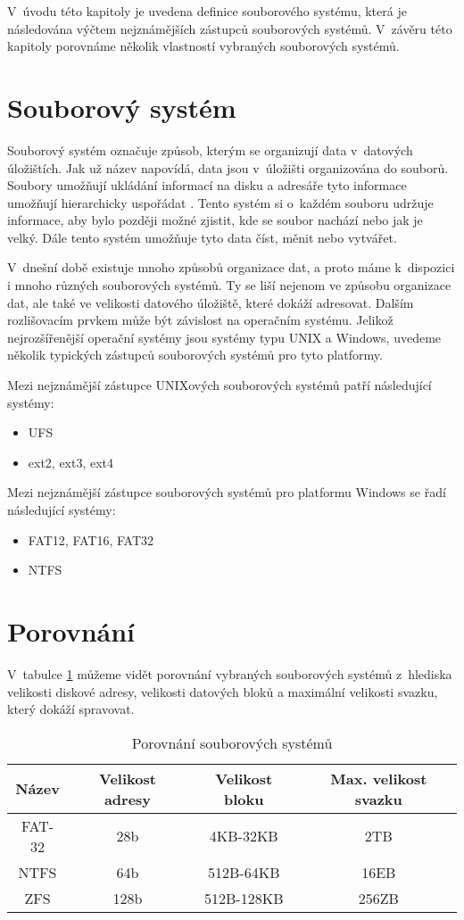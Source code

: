 V~úvodu této kapitoly je uvedena definice souborového systému, která je následována výčtem nejznámějších zástupců souborových systémů. V~závěru této kapitoly porovnáme několik vlastností vybraných souborových systémů.
\section{Souborový systém}
    \label{fs}
    Souborový systém označuje způsob, kterým se organizují data v~datových úložištích. Jak už název napovídá, data jsou v~úložišti organizována do souborů. Soubory umožňují ukládání informací na disku a adresáře tyto informace umožňují hierarchicky uspořádat \cite{fs}. Tento systém si o~každém souboru udržuje informace, aby bylo později možné zjistit, kde se soubor nachází nebo jak je velký. Dále tento systém umožňuje tyto data číst, měnit nebo vytvářet.

    V~dnešní době existuje mnoho způsobů organizace dat, a proto máme k~dispozici i mnoho různých souborových systémů. Ty se liší nejenom ve způsobu organizace dat,
    ale také ve velikosti datového úložiště, které dokáží adresovat. Dalším rozlišovacím prvkem může být závislost na operačním systému.
    Jelikož nejrozšířenější operační systémy jsou systémy typu UNIX a Windows, uvedeme několik typických zástupců souborových systémů pro tyto platformy.

    Mezi nejznámější zástupce UNIXových souborových systémů patří následující systémy:
    \begin{itemize}
      \item UFS
      \item ext2, ext3, ext4
    \end{itemize}

    Mezi nejznámější zástupce souborových systémů pro platformu Windows se řadí následující systémy:
    \begin{itemize}
      \item FAT12, FAT16, FAT32
      \item NTFS
    \end{itemize}

\section{Porovnání}
    V~tabulce \ref{fscompare} \cite{fs} můžeme vidět porovnání vybraných souborových systémů z~hlediska velikosti diskové adresy, velikosti datových bloků a maximální velikosti svazku, který dokáží spravovat.
    \begin{table}
    \centering
    \caption{Porovnání souborových systémů}
    \label{fscompare}
    \begin{tabular}{|c|c|c|c|}
    \hline
    Název & Velikost adresy & Velikost bloku & Max. velikost svazku \\ \hline
    FAT-32 & 28b & 4KB-32KB & 2TB \\ \hline
    NTFS & 64b & 512B-64KB & 16EB \\ \hline
    ZFS & 128b & 512B-128KB & 256ZB \\ \hline
    \end{tabular}
    \end{table} 